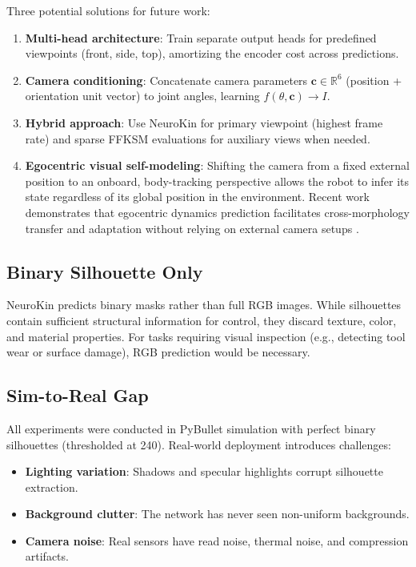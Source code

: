 \documentclass[12pt,a4paper,oneside]{report}
\begin{document}
Three potential solutions for future work:

\begin{enumerate}
    \item \textbf{Multi-head architecture}: Train separate output heads for predefined viewpoints (front, side, top), amortizing the encoder cost across predictions.
    \item \textbf{Camera conditioning}: Concatenate camera parameters $\mathbf{c} \in \mathbb{R}^6$ (position + orientation unit vector) to joint angles, learning $f(\theta, \mathbf{c}) \rightarrow I$.
    \item \textbf{Hybrid approach}: Use NeuroKin for primary viewpoint (highest frame rate) and sparse FFKSM evaluations for auxiliary views when needed.
    \item \textbf{Egocentric visual self-modeling}: Shifting the camera from a fixed external position to an onboard, body-tracking perspective allows the robot to infer its state regardless of its global position in the environment. Recent work demonstrates that egocentric dynamics prediction facilitates cross-morphology transfer and adaptation without relying on external camera setups \cite{hu2024egocentric}.
\end{enumerate}

\subsection{Binary Silhouette Only}

NeuroKin predicts binary masks rather than full RGB images. While silhouettes contain sufficient structural information for control, they discard texture, color, and material properties. For tasks requiring visual inspection (e.g., detecting tool wear or surface damage), RGB prediction would be necessary.

\subsection{Sim-to-Real Gap}

All experiments were conducted in PyBullet simulation with perfect binary silhouettes (thresholded at 240). Real-world deployment introduces challenges:

\begin{itemize}
    \item \textbf{Lighting variation}: Shadows and specular highlights corrupt silhouette extraction.
    \item \textbf{Background clutter}: The network has never seen non-uniform backgrounds.
    \item \textbf{Camera noise}: Real sensors have read noise, thermal noise, and compression artifacts.
\end{itemize}
\end{document}
